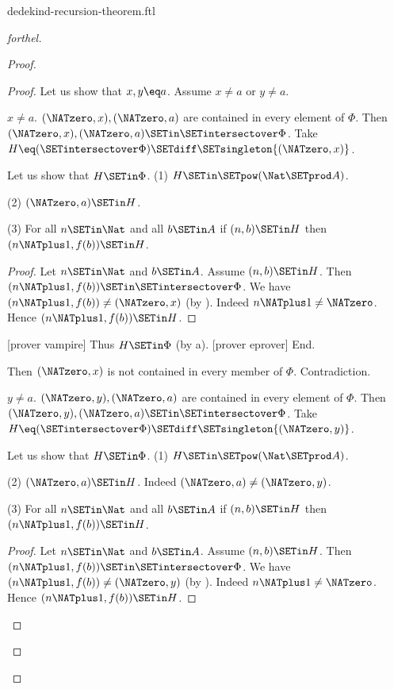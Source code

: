 \documentclass{naproche-library}
\begin{document}
\begin{smodule}[title=Dedekind's Recursion Theorem]{dedekind-recursion-theorem.ftl}
\begin{proof}[forthel]
\begin{proof}
\begin{proof}
        Let us show that $x, y \eq a$.
          Assume $x \neq a$ or $y \neq a$.

          \begin{case}{$x \neq a$.}
            $(\NATzero,x), (\NATzero,a)$ are contained in every element of $\Phi$.
            Then $(\NATzero,x), (\NATzero,a) \SETin \SETintersectover \Phi$.
            Take $H \eq (\SETintersectover \Phi) \SETdiff \SETsingleton{(\NATzero,x)}$.

            Let us show that $H \SETin \Phi$.
              (1) $H \SETin \SETpow(\Nat \SETprod A)$.

              (2) $(\NATzero,a) \SETin H$.

              (3) For all $n \SETin \Nat$ and all $b \SETin A$ if
              $(n,b) \SETin H$ then $(n \NATplus 1, f(b)) \SETin H$.
              \begin{proof}
                Let $n \SETin \Nat$ and $b \SETin A$.
                Assume $(n,b) \SETin H$.
                Then $(n \NATplus 1, f(b)) \SETin \SETintersectover \Phi$.
                We have $(n \NATplus 1, f(b)) \neq (\NATzero,x)$ (by ).
                Indeed $n \NATplus 1 \neq \NATzero$.
                Hence $(n \NATplus 1, f(b)) \SETin H$.
              \end{proof}

              [prover vampire]
              Thus $H \SETin \Phi$ (by a).
              [prover eprover]
            End.

            Then $(\NATzero,x)$ is not contained in every member of $\Phi$.
            Contradiction.
          \end{case}

          \begin{case}{$y \neq a$.}
            $(\NATzero,y), (\NATzero,a)$ are contained in every element of $\Phi$.
            Then $(\NATzero,y), (\NATzero,a) \SETin \SETintersectover \Phi$.
            Take $H \eq (\SETintersectover \Phi) \SETdiff \SETsingleton{(\NATzero,y)}$.

            Let us show that $H \SETin \Phi$.
              (1) $H \SETin \SETpow(\Nat \SETprod A)$.

              (2) $(\NATzero,a) \SETin H$.
              Indeed $(\NATzero,a) \neq (\NATzero,y)$.

              (3) For all $n \SETin \Nat$ and all $b \SETin A$ if
              $(n,b) \SETin H$ then $(n \NATplus 1, f(b)) \SETin H$.
              \begin{proof}
                Let $n \SETin \Nat$ and $b \SETin A$.
                Assume $(n,b) \SETin H$.
                Then $(n \NATplus 1, f(b)) \SETin \SETintersectover \Phi$.
                We have $(n \NATplus 1, f(b)) \neq (\NATzero,y)$ (by ).
                Indeed $n \NATplus 1 \neq \NATzero$.
                Hence $(n \NATplus 1, f(b)) \SETin H$.
              \end{proof}


\end{case}
\end{proof}
\end{proof}
\end{proof}
\end{smodule}
\end{document}
